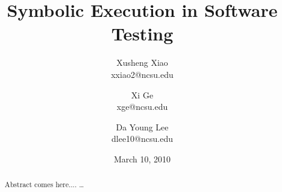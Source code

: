 \documentclass[times, 10pt,onecolumn]{article}
\title{Symbolic Execution in Software Testing}
\author{
Xusheng Xiao\\
\small{xxiao2@ncsu.edu}\\
\and
Xi Ge\\
\small{xge@ncsu.edu}\\
\and
Da Young Lee\\
\small{dlee10@ncsu.edu}
}
\date{March 10, 2010}
\begin{document}
\maketitle
\thispagestyle{empty}
\pagestyle{empty}

\begin{abstract}
Abstract comes here....
\ldots
\end{abstract}












\end{document}
